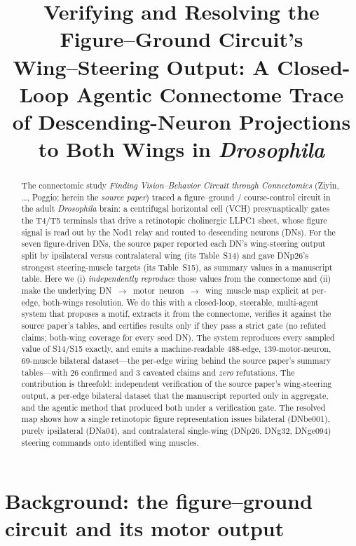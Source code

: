 \documentclass[11pt]{article}
\title{\vspace{-1.5em}\textbf{Verifying and Resolving the Figure--Ground Circuit's\\
Wing--Steering Output: A Closed-Loop Agentic Connectome Trace\\
of Descending-Neuron Projections to Both Wings in \emph{Drosophila}}}
\author{}
\date{}
\begin{document}
\maketitle
\vspace{-3em}

\begin{abstract}
\noindent
The connectomic study \emph{Finding Vision--Behavior Circuit through Connectomics}
(Ziyin, \ldots, Poggio; herein the \emph{source paper}) traced a figure--ground / course-control
circuit in the adult \emph{Drosophila} brain: a centrifugal horizontal cell (VCH) presynaptically
gates the T4/T5 terminals that drive a retinotopic cholinergic LLPC1 sheet, whose figure signal is
read out by the Nod1 relay and routed to descending neurons (DNs). For the seven figure-driven DNs,
the source paper reported each DN's wing-steering output split by ipsilateral versus contralateral
wing (its Table~S14) and gave DNp26's strongest steering-muscle targets (its Table~S15), as
summary values in a manuscript table. Here we (i) \emph{independently reproduce} those values from
the connectome and (ii) make the underlying \mbox{DN $\rightarrow$ motor neuron $\rightarrow$ wing
muscle} map explicit at per-edge, both-wings resolution. We do this with a closed-loop, steerable,
multi-agent system that proposes a motif, extracts it from the connectome, verifies it against the
source paper's tables, and certifies results only if they pass a strict gate (no refuted claims;
both-wing coverage for every seed DN). The system reproduces every sampled value of S14/S15 exactly,
and emits a machine-readable \mbox{$488$-edge}, \mbox{$139$-motor-neuron}, \mbox{$69$-muscle}
bilateral dataset---the per-edge wiring behind the source paper's summary tables---with $26$ confirmed
and $3$ caveated claims and \emph{zero} refutations. The contribution is threefold: independent
verification of the source paper's wing-steering output, a per-edge bilateral dataset that the
manuscript reported only in aggregate, and the agentic method that produced both under a verification
gate. The resolved map shows how a single retinotopic figure representation issues bilateral
(DNbe001), purely ipsilateral (DNa04), and contralateral single-wing (DNp26, DNg32, DNge094) steering
commands onto identified wing muscles.
\end{abstract}

\section{Background: the figure--ground circuit and its motor output}
\end{document}
